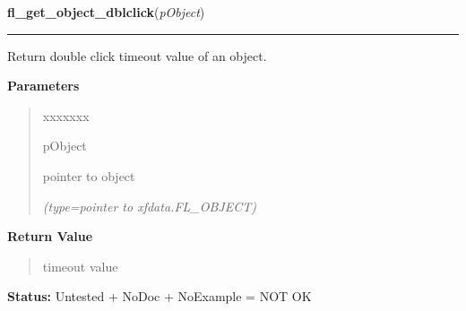 \hspace{.8\funcindent}\begin{boxedminipage}{\funcwidth}

    \raggedright \textbf{fl\_get\_object\_dblclick}(\textit{pObject})

    \vspace{-1.5ex}

    \rule{\textwidth}{0.5\fboxrule}
\setlength{\parskip}{2ex}
    Return double click timeout value of an object.

\setlength{\parskip}{1ex}
      \textbf{Parameters}
      \vspace{-1ex}

      \begin{quote}
        \begin{Ventry}{xxxxxxx}

          \item[pObject]

          pointer to object

            {\it (type=pointer to xfdata.FL\_OBJECT)}

        \end{Ventry}

      \end{quote}

      \textbf{Return Value}
    \vspace{-1ex}

      \begin{quote}
      timeout value

      \end{quote}

\textbf{Status:} Untested + NoDoc + NoExample = NOT OK



    \end{boxedminipage}

    \label{xformslib:library:fl_set_object_geometry}

    \vspace{0.5ex}

